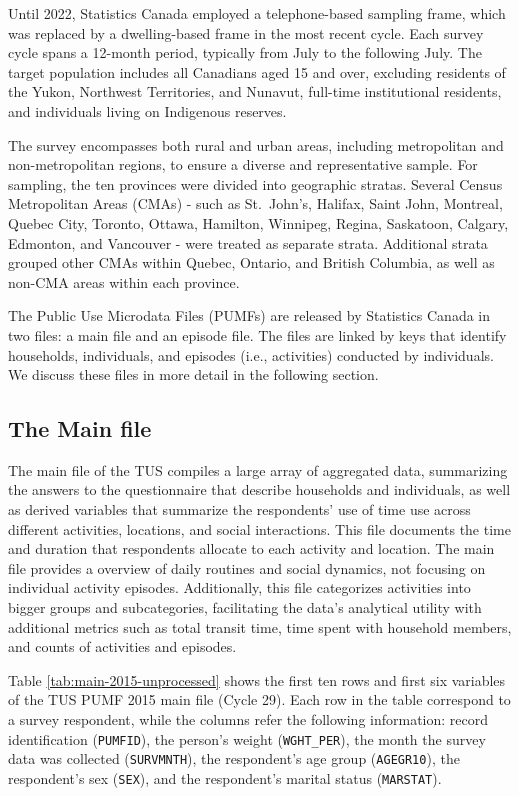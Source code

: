 \documentclass[Royal,times,sageh]{sagej}
\begin{document}
Until 2022, Statistics Canada employed a telephone-based sampling frame,
which was replaced by a dwelling-based frame in the most recent cycle.
Each survey cycle spans a 12-month period, typically from July to the
following July. The target population includes all Canadians aged 15 and
over, excluding residents of the Yukon, Northwest Territories, and
Nunavut, full-time institutional residents, and individuals living on
Indigenous reserves.

The survey encompasses both rural and urban areas, including
metropolitan and non-metropolitan regions, to ensure a diverse and
representative sample. For sampling, the ten provinces were divided into
geographic stratas. Several Census Metropolitan Areas (CMAs) - such as
St.~John's, Halifax, Saint John, Montreal, Quebec City, Toronto, Ottawa,
Hamilton, Winnipeg, Regina, Saskatoon, Calgary, Edmonton, and Vancouver
- were treated as separate strata. Additional strata grouped other CMAs
within Quebec, Ontario, and British Columbia, as well as non-CMA areas
within each province.

The Public Use Microdata Files (PUMFs) are released by Statistics Canada
in two files: a main file and an episode file. The files are linked by
keys that identify households, individuals, and episodes (i.e.,
activities) conducted by individuals. We discuss these files in more
detail in the following section.

\subsection{The Main file}\label{the-main-file}

The main file of the TUS compiles a large array of aggregated data,
summarizing the answers to the questionnaire that describe households
and individuals, as well as derived variables that summarize the
respondents' use of time use across different activities, locations, and
social interactions. This file documents the time and duration that
respondents allocate to each activity and location. The main file
provides a overview of daily routines and social dynamics, not focusing
on individual activity episodes. Additionally, this file categorizes
activities into bigger groups and subcategories, facilitating the data's
analytical utility with additional metrics such as total transit time,
time spent with household members, and counts of activities and
episodes.

Table \ref{tab:main-2015-unprocessed} shows the first ten rows and first
six variables of the TUS PUMF 2015 main file (Cycle 29). Each row in the
table correspond to a survey respondent, while the columns refer the
following information: record identification (\texttt{PUMFID}), the
person's weight (\texttt{WGHT\_PER}), the month the survey data was
collected (\texttt{SURVMNTH}), the respondent's age group
(\texttt{AGEGR10}), the respondent's sex (\texttt{SEX}), and the
respondent's marital status (\texttt{MARSTAT}).
\end{document}
